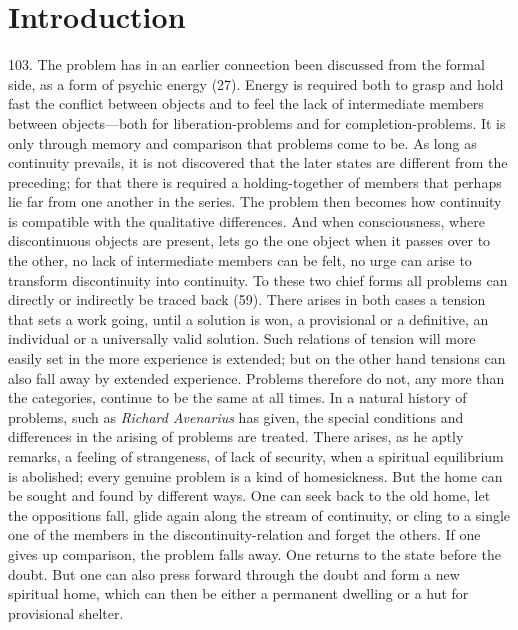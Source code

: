 \documentclass[12pt,a4paper]{book}
\newcommand{\opage}[1]{\marginnote{\footnotesize\textit{[#1]}}}
\begin{document}
\section*{Introduction}

\opage{246}103. The problem has in an earlier connection been discussed from the formal
side, as a form of psychic energy (27). Energy is required both to grasp and
hold fast the conflict between objects and to feel the lack of intermediate
members between objects---both for liberation-problems and for
completion-problems. It is only through memory and comparison that problems
come to be. As long as continuity prevails, it is not discovered that the
later states are different from the preceding; for that there is required a
holding-together of members that perhaps lie far from one another in the
series. The problem then becomes how continuity is compatible with the
qualitative differences. And when consciousness, where discontinuous objects
are present, lets go the one object when it passes over to the other, no lack
of intermediate members can be felt, no urge can arise to transform
discontinuity into continuity. To these two chief forms all problems can
directly or indirectly be traced back (59). There arises in both cases a
tension that sets a work going, until a solution is won, a provisional or a
definitive, an individual or a universally valid solution. Such relations of
tension will more easily set in the more experience is extended; but on the
other hand tensions can also fall away by extended experience. Problems
therefore do not, any more than the categories, continue to be the same at
all times. In a natural history of problems, such as \emph{Richard Avenarius}
has given, the special conditions and differences in the arising of \opage{247}problems
are treated. There arises, as he aptly remarks, a feeling of strangeness, of
lack of security, when a spiritual equilibrium is abolished; every genuine
problem is a kind of homesickness. But the home can be sought and found by
different ways. One can seek back to the old home, let the oppositions fall,
glide again along the stream of continuity, or cling to a single one of the
members in the discontinuity-relation and forget the others. If one gives up
comparison, the problem falls away. One returns to the state before the
doubt. But one can also press forward through the doubt and form a new
spiritual home, which can then be either a permanent dwelling or a hut for
provisional shelter.
\end{document}
